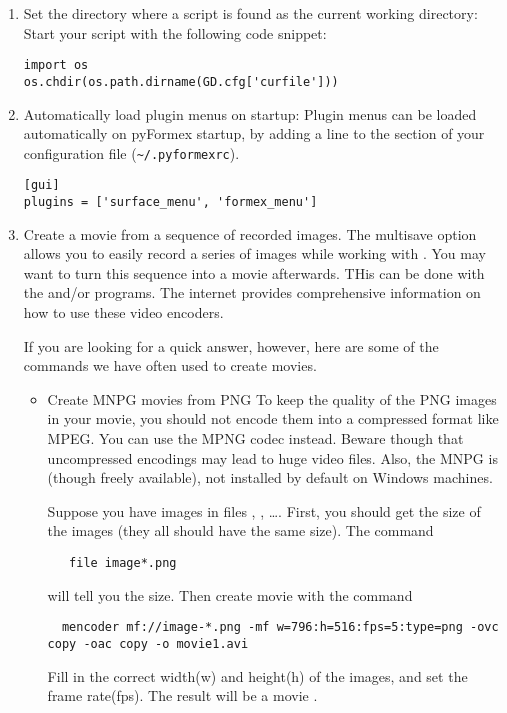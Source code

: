 \begin{enumerate}
\item Set the directory where a script is found as the current working directory:
Start your script with the following code snippet:
\begin{verbatim}
import os
os.chdir(os.path.dirname(GD.cfg['curfile']))
\end{verbatim}

\item Automatically load plugin menus on startup:
Plugin menus can be loaded automatically on pyFormex startup, by adding a line to the  section of your configuration file (\verb|~/.pyformexrc|).
\begin{verbatim}
[gui]
plugins = ['surface_menu', 'formex_menu']
\end{verbatim}


\item Create a movie from a sequence of recorded images.
The multisave option allows you to easily record a series of images while working with \pyformex. You may want to turn this sequence into a movie afterwards. THis can be done with the  and/or  programs. The internet provides comprehensive information on how to use these video encoders. 

If you are looking for a quick answer, however, here are some of the commands we have often used to create movies.
\begin{itemize}
\item Create MNPG movies from PNG
To keep the quality of the PNG images in your movie, you should not encode them into a compressed format like MPEG. You can use the MPNG codec instead. Beware though that uncompressed encodings may lead to huge video files. Also, the MNPG is (though freely available), not installed by default on Windows machines.

Suppose you have images in files , , \dots.
First, you should get the size of the images (they all should have the same size). The command 
\begin{verbatim}
   file image*.png
\end{verbatim}
 will tell you the size. Then create movie with the command
\begin{verbatim}
  mencoder mf://image-*.png -mf w=796:h=516:fps=5:type=png -ovc copy -oac copy -o movie1.avi
\end{verbatim}
Fill in the correct width(w) and height(h) of the images, and set the frame rate(fps). The result will be a movie .



\end{itemize}
\end{enumerate}

